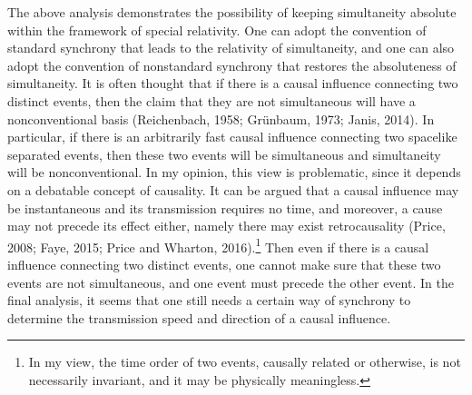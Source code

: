 The above analysis demonstrates the possibility of keeping simultaneity absolute within the framework of special relativity. One can adopt the convention of standard synchrony that leads to the relativity of simultaneity, and one can also adopt the convention of nonstandard synchrony that restores the absoluteness of simultaneity.
It is often thought that if there is a causal influence connecting two distinct events, then the claim that they are not simultaneous will have a nonconventional basis (Reichenbach, 1958; Gr\"{u}nbaum, 1973; Janis, 2014). In particular, if there is an arbitrarily fast causal influence connecting two spacelike separated events, then these two events will be simultaneous and simultaneity will be nonconventional. 
In my opinion, this view is problematic, since it depends on a debatable concept of causality.
It can be argued that a causal influence may be instantaneous and its transmission requires no time, and moreover, a cause may not precede its effect either, namely there may exist retrocausality (Price, 2008; Faye, 2015; Price and Wharton, 2016).\footnote{In my view, the time order of two events, causally related or otherwise, is not necessarily invariant, and it may be physically meaningless. } Then even if there is a causal influence connecting two distinct events, one cannot make sure that  these two  events are not simultaneous, and one event must precede the other event.
In the final analysis, it seems that one still needs a certain way of synchrony to determine the transmission speed and direction of a causal influence. 

